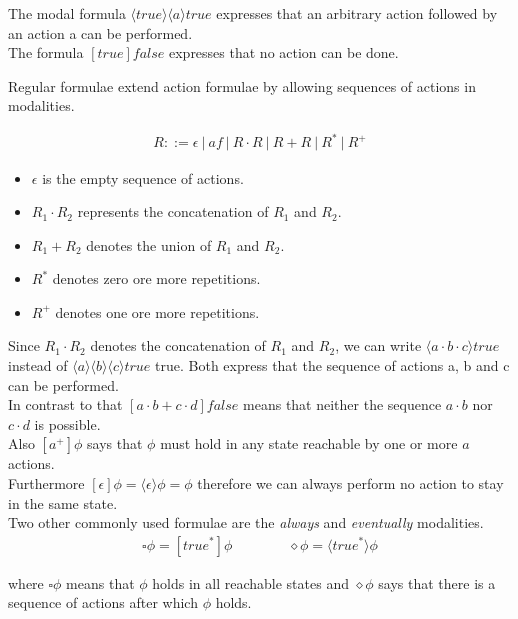 \documentclass{clseminar}
\begin{document}
  The modal formula $\langle true \rangle \langle a \rangle true$ expresses that an arbitrary action followed by an action a can be performed. \\
  The formula $[true]false$ expresses that no action can be done.

  Regular formulae extend action formulae by allowing sequences of actions in modalities.

  \begin{align*}
    R ::= \epsilon\ |\ \mathit{af}\ |\ R\cdot{R}\ |\ R+R\ |\ R^*\ |\ R^+
  \end{align*}

  \begin{itemize}
    \item $\epsilon$ is the empty sequence of actions.
    \item $R_1\cdot{R_2}$ represents the concatenation of $R_1$ and $R_2$.
    \item $R_1+R_2$ denotes the union of  $R_1$ and $R_2$.
    \item $R^*$ denotes zero ore more repetitions.
    \item $R^+$ denotes one ore more repetitions.
  \end{itemize}

  Since $R_1\cdot{R_2}$ denotes the concatenation of $R_1$ and $R_2$, we can write $\langle a \cdot b \cdot c \rangle true$ instead of $\langle a \rangle \langle b \rangle \langle c \rangle true$ true. Both express that the sequence of actions a, b and c can be performed. \\
  In contrast to that $[a\cdot{b} + c\cdot{d}]\mathit{false}$ means that neither the sequence $a\cdot{b}$ nor $c\cdot{d}$ is possible. \\
  Also $[a^+]\phi$ says that $\phi$ must hold in any state reachable by one or more $a$ actions. \\
  Furthermore $[\epsilon]\phi = \langle \epsilon \rangle \phi = \phi$ therefore we can always perform no action to stay in the same state. \\

  Two other commonly used formulae are the \textit{always} and \textit{eventually} modalities.\\

  \begin{align*}
    \square\phi = [\mathit{true}^*]\phi \qquad\qquad    \diamond\phi = \langle\mathit{true}^*\rangle\phi
  \end{align*}

  where $\square\phi$ means that $\phi$ holds in all reachable states and $\diamond\phi$ says that there is a sequence of actions after which $\phi$ holds. \\
\end{document}
